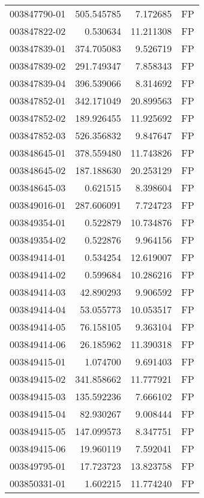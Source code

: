 \begin{tabular}{lrrl}
003847790-01 &  505.545785 &       7.172685 &   FP \\
003847822-02 &    0.530634 &      11.211308 &   FP \\
003847839-01 &  374.705083 &       9.526719 &   FP \\
003847839-02 &  291.749347 &       7.858343 &   FP \\
003847839-04 &  396.539066 &       8.314692 &   FP \\
003847852-01 &  342.171049 &      20.899563 &   FP \\
003847852-02 &  189.926455 &      11.925692 &   FP \\
003847852-03 &  526.356832 &       9.847647 &   FP \\
003848645-01 &  378.559480 &      11.743826 &   FP \\
003848645-02 &  187.188630 &      20.253129 &   FP \\
003848645-03 &    0.621515 &       8.398604 &   FP \\
003849016-01 &  287.606091 &       7.724723 &   FP \\
003849354-01 &    0.522879 &      10.734876 &   FP \\
003849354-02 &    0.522876 &       9.964156 &   FP \\
003849414-01 &    0.534254 &      12.619007 &   FP \\
003849414-02 &    0.599684 &      10.286216 &   FP \\
003849414-03 &   42.890293 &       9.906592 &   FP \\
003849414-04 &   53.055773 &      10.053517 &   FP \\
003849414-05 &   76.158105 &       9.363104 &   FP \\
003849414-06 &   26.185962 &      11.390318 &   FP \\
003849415-01 &    1.074700 &       9.691403 &   FP \\
003849415-02 &  341.858662 &      11.777921 &   FP \\
003849415-03 &  135.592236 &       7.666102 &   FP \\
003849415-04 &   82.930267 &       9.008444 &   FP \\
003849415-05 &  147.099573 &       8.347751 &   FP \\
003849415-06 &   19.960119 &       7.592041 &   FP \\
003849795-01 &   17.723723 &      13.823758 &   FP \\
003850331-01 &    1.602215 &      11.774240 &   FP \\

\end{tabular}
